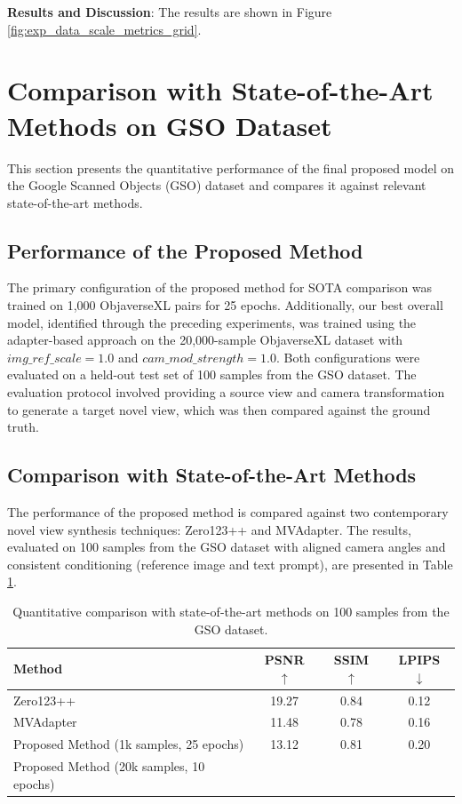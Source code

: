 \textbf{Results and Discussion}: The results are shown in Figure \ref{fig:exp_data_scale_metrics_grid}.

\section{Comparison with State-of-the-Art Methods on GSO Dataset}\label{sec:exp_gso_quantitative_sota}

This section presents the quantitative performance of the final proposed model on the Google Scanned Objects (GSO) dataset and compares it against relevant state-of-the-art methods.

\subsection{Performance of the Proposed Method}\label{ssec:exp_gso_our_model}
The primary configuration of the proposed method for SOTA comparison was trained on 1,000 ObjaverseXL pairs for 25 epochs. Additionally, our best overall model, identified through the preceding experiments, was trained using the adapter-based approach on the 20,000-sample ObjaverseXL dataset with $img\_ref\_scale=1.0$ and $cam\_mod\_strength=1.0$. Both configurations were evaluated on a held-out test set of 100 samples from the GSO dataset. The evaluation protocol involved providing a source view and camera transformation to generate a target novel view, which was then compared against the ground truth.

\subsection{Comparison with State-of-the-Art Methods}\label{ssec:exp_sota_comparison}
The performance of the proposed method is compared against two contemporary novel view synthesis techniques: Zero123++ and MVAdapter. The results, evaluated on 100 samples from the GSO dataset with aligned camera angles and consistent conditioning (reference image and text prompt), are presented in Table \ref{tab:sota_comparison_gso}.

\begin{table}[htbp]
  \centering
  \caption{Quantitative comparison with state-of-the-art methods on 100 samples from the GSO dataset.}
  \label{tab:sota_comparison_gso}
  \begin{tabular}{lccc}
    \toprule
    \textbf{Method} & \textbf{PSNR} $\uparrow$ & \textbf{SSIM} $\uparrow$ & \textbf{LPIPS} $\downarrow$ \\
    \midrule
    Zero123++ \cite{zero1to3} & 19.27 & 0.84 & 0.12 \\
    MVAdapter \cite{mvadapter} & 11.48 & 0.78 & 0.16 \\
    Proposed Method (1k samples, 25 epochs) & 13.12 & 0.81 & 0.20 \\
    Proposed Method (20k samples, 10 epochs) &  &  &  \\ %
    \bottomrule
  \end{tabular}
\end{table}

